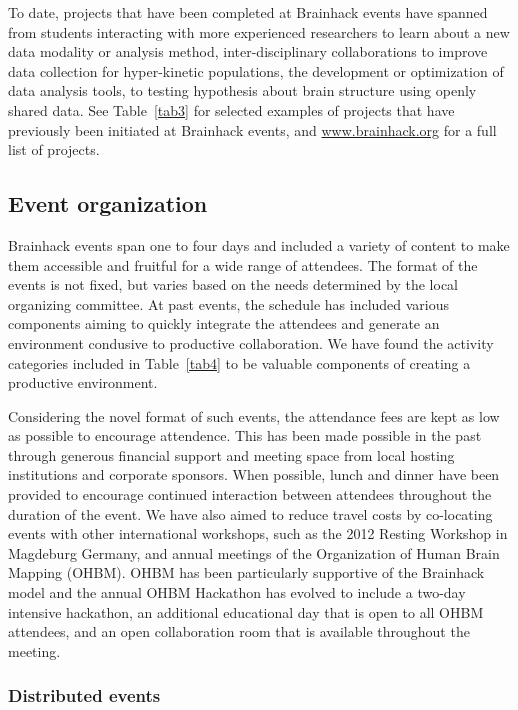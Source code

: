 \documentclass[11pt]{bmc_article_s50}
\begin{document}
To date, projects that have been completed at Brainhack events have spanned from students interacting with more experienced researchers to learn about a new data modality or analysis method, inter-disciplinary collaborations to improve data collection for hyper-kinetic populations, the development or optimization of data analysis tools, to testing hypothesis about brain structure using openly shared data. See Table~\ref{tab3} for selected examples of projects that have previously been initiated at Brainhack events, and \href{http://www.brainhack.org}{www.brainhack.org} for a full list of projects.

\subsection{Event organization}

Brainhack events span one to four days and included a variety of content to make them accessible and fruitful for a wide range of attendees. The format of the events is not fixed, but varies based on the needs determined by the local organizing committee. At past events, the schedule has included various components aiming to quickly integrate the attendees and generate an environment condusive to productive collaboration. We have found the activity categories included in Table~\ref{tab4} to be valuable components of creating a productive environment. 

Considering the novel format of such events, the attendance fees are kept as low as possible to encourage attendence. This has been made possible in the past through generous financial support and meeting space from local hosting institutions and corporate sponsors. When possible, lunch and dinner have been provided to encourage continued interaction between attendees throughout the duration of the event. We have also aimed to reduce travel costs by co-locating events with other international workshops, such as the 2012 Resting Workshop in Magdeburg Germany, and annual meetings of the Organization of Human Brain Mapping (OHBM). OHBM has been particularly supportive of the Brainhack model and the annual OHBM Hackathon has evolved to include a two-day intensive hackathon, an additional educational day that is open to all OHBM attendees, and an open collaboration room that is available throughout the meeting.

\subsubsection{Distributed events}
\end{document}

